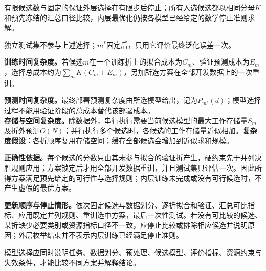有限候选数与固定的\kFold{}保证外层选择在有限步后停止；所有入选候选都以相同分母$K$和预先冻结的汇总口径比较，内层最优化仍按各模型已经给定的数学停止准则求解。

独立测试集不参与上述选择；$m^*$固定后，只用它评价最终泛化误差一次。

\label{struct:V3-C07-CH26}
\textbf{训练时间复杂度。}若候选$m$在一个训练折上的拟合成本为$C_m$、验证预测成本为$E_m$，\kFold{}选择总成本约为$\sum_m K(C_m+E_m)$，另加所选方案在全部开发数据上的一次重训。

\label{struct:V3-C07-CH27}
\textbf{预测时间复杂度。}最终部署预测复杂度由所选模型给出，记为$P_{m^*}(d)$；模型选择过程不能用验证阶段的总成本替代该部署成本。\\
\textbf{存储与空间复杂度。}除数据外，串行执行需要当前候选模型的最大工作存储量$S_m$及折外预测$O(N)$；并行执行多个候选时，各候选的工作存储量近似相加。\textbf{复杂度假设：}各折顺序复用存储空间；缓存全部候选会增加到近似求和规模。

\textbf{正确性依据。}每个候选的分数只由其未参与拟合的验证折产生，硬约束先于并列决胜规则应用；方案锁定后才用全部开发数据重训，并且测试集只评估一次。因此所得方案满足预先给定的可行性与选择规则；内层训练未完成或没有可行候选时，不产生虚假的最优方案。

\textbf{更新顺序与停止情形。}依次固定候选与数据划分、逐折拟合和验证、汇总可比指标、应用既定并列规则、重训选中方案，最后一次性测试。若没有可比较的候选、某折缺少必要类别或资源指标口径不一致，应停止比较或排除相应候选并说明原因；外层枚举结束并不表示内层训练已经满足停止准则。


模型选择应同时说明任务、数据划分、预处理、候选模型、评价指标、资源约束与失效条件，才能比较不同方案并解释结论。

